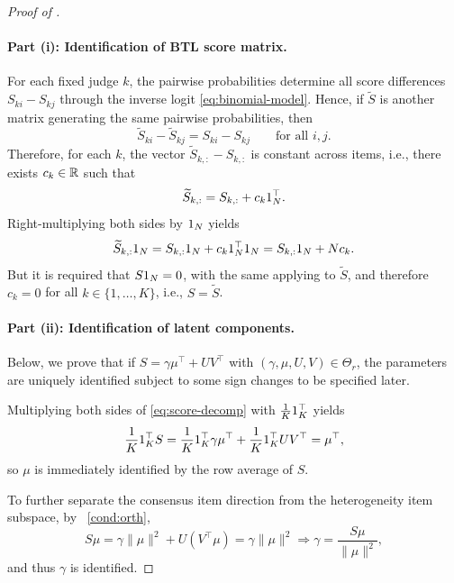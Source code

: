 \documentclass{article}
\begin{document}
\begin{bibunit}[unsrtnat]
\begin{proof}[Proof of ]
    \paragraph{Part (i): Identification of BTL score matrix.}
    For each fixed judge $k$, the pairwise probabilities determine all score differences $S_{ki}-S_{kj}$ through the inverse logit \eqref{eq:binomial-model}. Hence, if $\tilde{S}$ is another matrix generating the same pairwise probabilities, then $$\tilde{S}_{ki}-\tilde{S}_{kj}=S_{ki}-S_{kj} \qquad \text{for all } i,j.$$
    Therefore, for each $k$, the vector $\tilde{S}_{k,:}-S_{k,:}$ is constant across items, i.e., there exists $c_k\in\mathbb{R}$ such that
    $$\widetilde{S}_{k,:}=S_{k,:}+c_k1_N^\top.$$
    Right-multiplying both sides by $1_N$ yields 
    $$\widetilde{S}_{k,:}1_N=S_{k,:}1_N+c_k1_N^\top1_N=S_{k,:}1_N+Nc_k.$$
    But it is required that $S1_N=0$, with the same applying to $\tilde{S}$, and therefore $c_k=0$ for all $k\in\{1,\ldots,K\}$, i.e., $S=\tilde{S}$.

    \paragraph{Part (ii): Identification of latent components.}
    Below, we prove that if $S=\gamma\mu^\top+UV^\top$ with $(\gamma,\mu,U,V)\in\Theta_r$, the parameters are uniquely identified subject to some sign changes to be specified later.

    Multiplying both sides of \eqref{eq:score-decomp} with $\frac{1}{K}1_K^\top$ yields 
    \begin{equation} \label{eq:mu}
    \frac{1}{K}1_K^{\top}S = \frac{1}{K}1_K^{\top}\gamma\mu^{\top} + \frac{1}{K}1_K^{\top}UV^{\top} = \mu^{\top},
    \end{equation}
    so $\mu$ is immediately identified by the row average of $S$.
    
    To further separate the consensus item direction from the heterogeneity item subspace, by ~\ref{cond:orth},
    \begin{equation} \label{eq:gamma}
        S\mu = \gamma\|\mu\|^2 + U(V^{\top}\mu) = \gamma\|\mu\|^2 \Longrightarrow \gamma = \frac{S\mu}{\|\mu\|^2},
    \end{equation}
    and thus $\gamma$ is identified.


\end{proof}
\end{bibunit}
\end{document}
